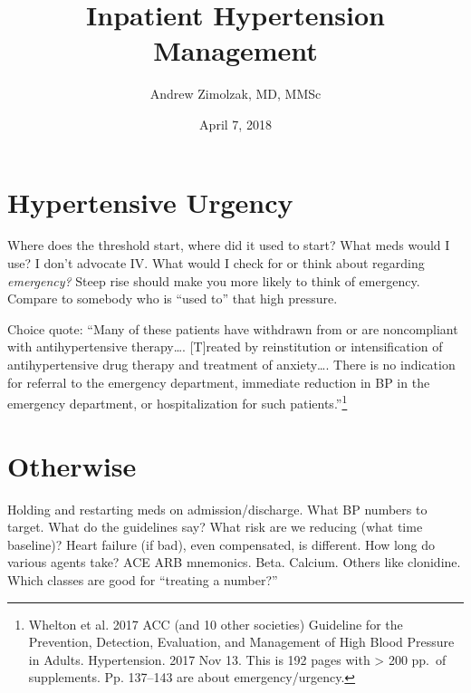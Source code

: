 \documentclass{tufte-handout}
\title{Inpatient Hypertension Management}
\author{Andrew Zimolzak, MD, MMSc}
\date{April 7, 2018}
\begin{document}
\maketitle


\section{Hypertensive Urgency}


Where does the threshold start, where did it used to start?
What meds would I use? I
don't advocate IV. What would I check for or think about regarding
\emph{emergency?} Steep rise should make you more likely to think of
emergency. Compare to somebody who is ``used to'' that high pressure.

Choice quote: ``Many of these
patients have withdrawn from or are noncompliant with antihypertensive therapy\ldots{}.
[T]reated by reinstitution or intensification of antihypertensive drug
therapy and treatment of anxiety\ldots{}. There is no indication for referral to the emergency
department, immediate reduction in BP in the emergency department, or hospitalization for such
patients.''\footnote{Whelton et al. 2017 ACC (and 10 other societies) Guideline for the Prevention, Detection, Evaluation, and Management of High Blood Pressure in Adults. Hypertension. 2017 Nov 13. This is 192 pages with > 200 pp.\ of supplements. Pp. 137--143 are about emergency/urgency.}


\section{Otherwise}

Holding and restarting meds on admission/discharge.
What BP numbers to target. What do the guidelines
say? What risk are we reducing (what time baseline)?
Heart failure (if bad), even compensated, is different.
How long do various agents take? ACE ARB mnemonics. Beta. Calcium.
Others like clonidine. Which classes are good for ``treating a number?''
\end{document}
